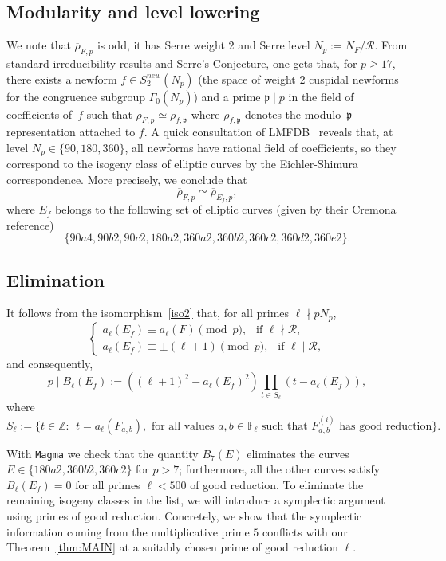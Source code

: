 \documentclass[12pt]{amsart}
\numberwithin{equation}{section}
\theoremstyle{definition}
\newcommand{\F}{\mathbb{F}}
\newcommand{\Z}{\mathbb{Z}}
\newcommand{\rhobar}{{\overline{\rho}}}
\newcommand{\fp}{\mathfrak{p}}
\begin{document}
\subsection{Modularity and level lowering}\label{sec:MLL}  
We note that $\rhobar_{F,p}$ is odd, it has Serre weight 2 and Serre level $N_p := N_F / \mathcal R$. From standard irreducibility results and Serre's Conjecture, one gets that, for $p \geq 17$, there exists a newform $f\in
S_2^{new}(N_p)$ (the space of weight $2$ cuspidal newforms for the congruence subgroup $\Gamma_0(N_p)$)
and a prime $\fp \mid p$ in the field of coefficients of~$f$ such that 
$\rhobar_{F,p} \simeq \rhobar_{f,\fp}$
where $\rhobar_{f,\fp}$ denotes the
modulo~$\fp$ representation attached to $f$. A quick consultation of 
LMFDB~\cite{LMFDB} reveals that, at level $N_p \in \{90,180,360\}$,
all newforms have rational field of coefficients, so they correspond to the isogeny class of elliptic curves by the Eichler-Shimura correspondence. More precisely, we conclude that 
\begin{equation} \label{iso2}
\rhobar_{F,p} \simeq  \rhobar_{E_f,p},
\end{equation}
where $E_f$ belongs to the following set
of elliptic curves  (given by their Cremona reference)
\begin{equation}\label{eq:Ef}
    \{ 90a4,90b2,90c2,180a2, 360a2, 360b2, 360c2, 360d2,360e2 \}.
\end{equation}

\subsection{Elimination}\label{sec:elimination}
It follows from the isomorphism~\eqref{iso2} that,
for all primes $\ell \nmid pN_p$,
\[
\begin{cases}
    a_{\ell}(E_f) \equiv a_{\ell}(F) \pmod{p}, \:\: \text{ if } \ell \nmid  \mathcal{R},\\
    a_\ell(E_f) \equiv \pm (\ell+1) \pmod{p}, \:\: \text{ if } \ell \mid  \mathcal{R},
\end{cases}
\]
and consequently, \[p\mid B_\ell(E_f):=((\ell+1)^2-a_\ell(E_f)^2)\prod_{t\in S_\ell} (t-a_\ell(E_f)),\] where
\[
S_\ell:=\{t\in \Z: \:\: t=a_\ell(F_{a,b}), \text{ for all values }a,b \in \F_\ell \text{ such that }F^{(i)}_{a,b} \text{ has good reduction}  \}.
\]


With {\tt Magma} we check that the quantity $B_7(E)$ eliminates the curves
$E \in \{180a2,360b2,360c2 \}$ for $p > 7$; furthermore, all the other curves satisfy $B_\ell(E_f) = 0$ for all primes $\ell < 500$ of good reduction.
To eliminate the remaining isogeny classes in the list, we will introduce a symplectic argument  using primes of good reduction. Concretely, we show that the symplectic information coming from the multiplicative prime $5$ conflicts with our Theorem~\ref{thm:MAIN} at a suitably chosen prime of good reduction $\ell$.
\end{document}
